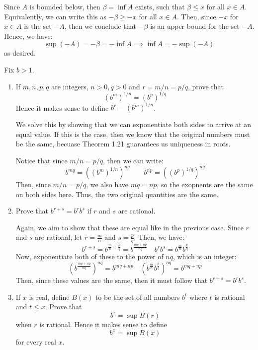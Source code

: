 \documentclass[10pt]{article}
\begin{document}
	\begin{solution}
		Since \( A \) is bounded below, then \( \beta = \inf A \) exists, such that \( \beta \le  x \) for all 
		\( x \in A \). Equivalently, we can write this as \( -\beta \ge -x \) for all \( x \in A \). Then, since 
		\( -x \) for \( x \in A \) is the set \( -A \), then we conclude that \( -\beta \) is an upper bound 
		for the set \( -A \). Hence, we have:
		\[
		\sup(-A) = - \beta = - \inf A \implies \inf A = - \sup (-A)
		\] 
		as desired. 
	\end{solution}
	\begin{problem}
		Fix \( b > 1 \). 
		\begin{enumerate}[label=\alph*)]
			\item If \( m, n, p, q \) are integers, \( n >0, q > 0 \) and \( r = m / n = p / q \), prove that 
				\[
					(b^{m})^{1 / n} = (b^{p})^{1 / q}
				\] 
				Hence it makes sense to define \( b^{r} = (b^{m})^{1 / n} \). 

				\begin{solution}
					We solve this by showing that we can exponentiate both sides to arrive at an equal value. If this 
					is the case, then we know that the original numbers must be the same, becuase Theorem 1.21
					guarantees us uniqueness in roots. 

					Notice that since \( m / n = p / q \), then we can write:
					\[
					b^{mq}	= \left(  (b^{m})^{1 / n}\right)^{n q}\quad \quad
						b^{np} = \left( (b^{p})^{1 / q} \right)^{nq} 
					\] 
					Then, since \( m / n = p / q \), we also have \( mq = np \), so the exopnents are the same 
					on both sides here. Thus, the two original quantities are the same. 
				\end{solution}
			\item Prove that \( b^{r + s} = b^{r} b^{s} \) if \( r \) and \( s \) are rational. 

				\begin{solution}
					Again, we aim to show that these are equal like in the previous case. Since \( r \) and \( 
					s\) are rational, let \( r = \frac{m}{n} \) and \( s = \frac{p}{q} \). Then, we have:
					\[
					b^{r + s} = b^{\frac{m}{n} + \frac{p}{q}} = b^{\frac{mq + np}{nq}}\quad 
					b^{r}b^{s} = b^{\frac{m}{n}}b^{\frac{p}{q}} 
					\]  
					Now, exponentiate both of these to the power of \( nq \), which is an integer:
					\[
						(b^{\frac{mq + np}{nq}})^{nq} = b^{mq + np} \quad \left(b^{\frac{m}{n}} b^{\frac{p}{q}}\right)
						^{nq} = b^{mq + np}
					\] 
					Then, since these values are the same, then it must follow that \( b^{r + s} = b^{r} b^{s} \). 
				\end{solution}
			\item If \( x \) is real, define \( B(x) \) to be the set of all numbers \( b^{t} \) where \( t \) 
				is rational and \( t \le x \). Prove that 
				\[
				b^{r} = \sup B(r)
				\] 
				when \( r \) is rational. Hence it makes sense to define 
				 \[
				b^{x} = \sup B(x)
				\] 
				for every real \( x \).


\end{enumerate}
\end{problem}
\end{document}
